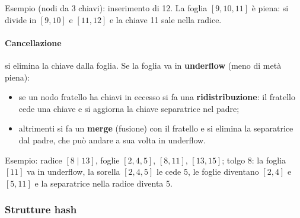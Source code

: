 \documentclass[a4paper,12pt]{article}
\begin{document}
Esempio (nodi da 3 chiavi): inserimento di 12. La foglia $[9,10,11]$ è piena:
si divide in $[9,10]$ e $[11,12]$ e la chiave 11 sale nella radice.
\begin{center}
\end{center}

\paragraph{Cancellazione} si elimina la chiave dalla foglia. Se la foglia va
in \textbf{underflow} (meno di metà piena):
\begin{itemize}
  \item se un nodo fratello ha chiavi in eccesso si fa una
    \textbf{ridistribuzione}: il fratello cede una chiave e si aggiorna la
    chiave separatrice nel padre;
  \item altrimenti si fa un \textbf{merge} (fusione) con il fratello e si
    elimina la separatrice dal padre, che può andare a sua volta in underflow.
\end{itemize}
Esempio: radice $[8 \mid 13]$, foglie $[2,4,5]$, $[8,11]$, $[13,15]$; tolgo
8: la foglia $[11]$ va in underflow, la sorella $[2,4,5]$ le cede 5, le foglie
diventano $[2,4]$ e $[5,11]$ e la separatrice nella radice diventa 5.

\subsubsection{Strutture hash}
\end{document}
